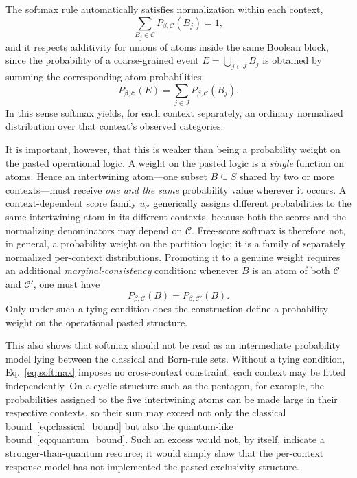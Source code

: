 \documentclass[aps,pra,twocolumn,superscriptaddress,floatfix,longbibliography]{revtex4-2}
\begin{document}
The softmax rule automatically satisfies normalization within each
context,
\[
\sum_{B_j\in\mathcal C}P_{\beta,\mathcal C}(B_j)=1,
\]
and it respects additivity for unions of atoms inside the same Boolean
block, since the probability of a coarse-grained event
\(E=\bigcup_{j\in J}B_j\) is obtained by summing the corresponding atom
probabilities:
\[
P_{\beta,\mathcal C}(E)
=
\sum_{j\in J}P_{\beta,\mathcal C}(B_j).
\]
In this sense softmax yields, for each context separately, an ordinary
normalized distribution over that context's observed categories.

It is important, however, that this is weaker than being a probability
weight on the pasted operational logic. A weight on the pasted logic
is a \emph{single} function on atoms. Hence an intertwining atom---one
subset \(B\subseteq S\) shared by two or more contexts---must receive
\emph{one and the same} probability value wherever it occurs. A
context-dependent score family \(u_{\mathcal C}\) generically assigns
different probabilities to the same intertwining atom in its different
contexts, because both the scores and the normalizing denominators may
depend on \(\mathcal C\). Free-score softmax is therefore not, in
general, a probability weight on the partition logic; it is a family
of separately normalized per-context distributions. Promoting it to a
genuine weight requires an additional \emph{marginal-consistency}
condition: whenever \(B\) is an atom of both \(\mathcal C\) and
\(\mathcal C'\), one must have
\[
P_{\beta,\mathcal C}(B)=P_{\beta,\mathcal C'}(B).
\]
Only under such a tying condition does the construction define a
probability weight on the operational pasted structure.

This also shows that softmax should not be read as an intermediate
probability model lying between the classical and Born-rule sets.
Without a tying condition, Eq.~\eqref{eq:softmax} imposes no
cross-context constraint: each context may be fitted independently.
On a cyclic structure such as the pentagon, for example, the
probabilities assigned to the five intertwining atoms can be made
large in their respective contexts, so their sum may exceed not only
the classical bound~\eqref{eq:classical_bound} but also the
quantum-like bound~\eqref{eq:quantum_bound}. Such an excess would not,
by itself, indicate a stronger-than-quantum resource; it would simply
show that the per-context response model has not implemented the
pasted exclusivity structure.
\end{document}
